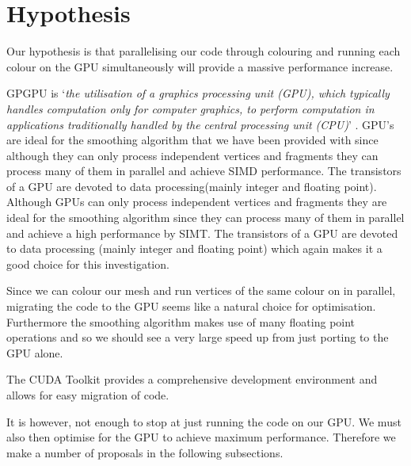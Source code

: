 \section{Hypothesis}
Our hypothesis is that parallelising our code through colouring and running each colour on the GPU simultaneously will provide a massive performance increase.


GPGPU is `\emph{the utilisation of a graphics processing unit (GPU), which typically handles computation only for computer graphics, to perform computation in applications traditionally handled by the central processing unit (CPU)}' \cite{gpgpu}.
GPU's are ideal for the smoothing algorithm that we have been provided with since although they can only process independent vertices and fragments they can process many of them in parallel and achieve SIMD performance. The transistors of a GPU are devoted to data processing(mainly integer and floating point)\cite{lec7}.
Although GPUs can only process independent vertices and fragments they are ideal for the smoothing algorithm since they can process many of them in parallel and achieve a high performance by SIMT. The transistors of a GPU are devoted to data processing (mainly integer and floating point) which again makes it a good choice for this investigation\cite{lec7}.


Since we can colour our mesh and run vertices of the same colour on in parallel, migrating the code to the GPU seems like a natural choice for optimisation. Furthermore the smoothing algorithm makes use of many floating point operations and so we should see a very large speed up from just porting to the GPU alone.

The CUDA Toolkit provides a comprehensive development environment and allows for easy migration of code.




It is however, not enough to stop at just running the code on our GPU. We must also then optimise for the GPU to achieve maximum performance. Therefore we make a number of proposals in the following subsections.





